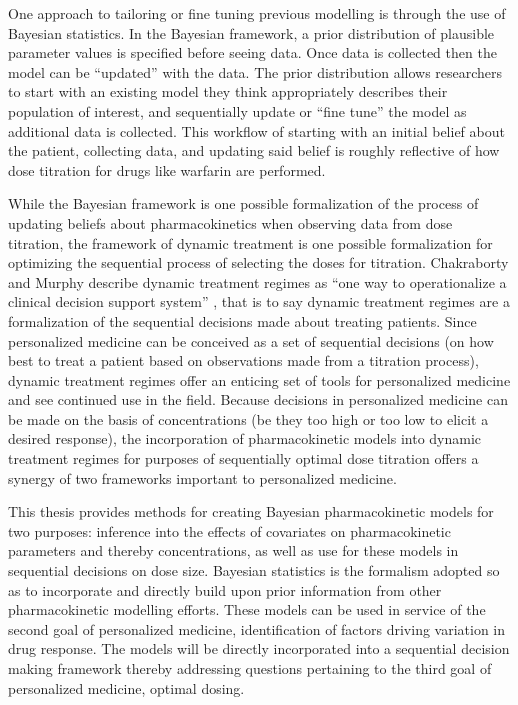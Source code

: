 One approach to tailoring or fine tuning previous modelling is through the use of Bayesian statistics.  In the Bayesian framework, a prior distribution of plausible parameter values is specified before seeing data.  Once data is collected then the model can be ``updated'' with the data.  The prior distribution allows researchers to start with an existing model they think appropriately describes their population of interest, and sequentially update or ``fine tune'' the model as additional data is collected. This workflow of starting with an initial belief about the patient, collecting data, and updating said belief is roughly reflective of how dose titration for drugs like warfarin are performed.   

While the Bayesian framework is one possible formalization of the process of updating beliefs about pharmacokinetics when observing data from dose titration, the framework of dynamic treatment is one possible formalization for optimizing the sequential process of selecting the doses for titration.  Chakraborty and Murphy describe dynamic treatment regimes as ``one way to operationalize a clinical decision support system'' \cite{chakraborty_dynamic_2014}, that is to say dynamic treatment regimes are a formalization of the sequential decisions made about treating patients.  Since personalized medicine can be conceived as a set of sequential decisions (on how best to treat a patient based on observations made from a titration process), dynamic treatment regimes offer an enticing set of tools for personalized medicine and see continued use in the field.  Because decisions in personalized medicine can be made on the basis of concentrations (be they too high or too low to elicit a desired response), the incorporation of pharmacokinetic models into dynamic treatment regimes for purposes of sequentially optimal dose titration offers a synergy of two frameworks important to personalized medicine.

This thesis provides methods for creating Bayesian pharmacokinetic models for two purposes: inference into the effects of covariates on pharmacokinetic parameters and thereby concentrations, as well as use for these models in sequential decisions on dose size.    Bayesian statistics is the formalism adopted so as to incorporate and directly build upon prior information from other pharmacokinetic modelling efforts.  These models can be used in service of the second goal of personalized medicine, identification of factors driving variation in drug response.  The models will be directly incorporated into a sequential decision making framework thereby addressing questions pertaining to the third goal of personalized medicine, optimal dosing.


